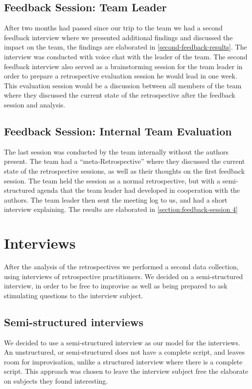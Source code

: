 \subsection{Feedback Session: Team Leader}
After two months had passed since our trip to the team we had a second feedback interview where we presented additional findings and discussed the impact on the team, the findings are elaborated in  \autoref{second-feedback-results}. The interview was conducted with voice chat with the leader of the team. The second feedback interview also served as a brainstorming session for the team leader in order to prepare a retrospective evaluation session he would lead in one week. This evaluation session would be a discussion between all members of the team where they discussed the current state of the retrospective after the feedback session and analysis.

\subsection{Feedback Session: Internal Team Evaluation}
The last session was conducted by the team internally without the authors present. The team had a ``meta-Retrospective'' where they discussed the current state of the retrospective sessions, as well as their thoughts on the first feedback session. The team held the session as a normal retrospective, but with a semi-structured agenda that the team leader had developed in cooperation with the authors. The team leader then sent the meeting log to us, and had a short interview explaining. The results are elaborated in \autoref{section:feedback-session 4}


\section{Interviews}	
After the analysis of the retrospectives we performed a second data collection, using interviews of retrospective practitioners. We decided on a semi-structured interview, in order to be free to improvise as well as being prepared to ask stimulating questions to the interview subject.

\subsection{Semi-structured interviews}
We decided to use a semi-structured interview as our model for the interviews. An unstructured, or semi-structured does not have a complete script, and leaves room for improvisation, unlike a structured interview where there is a complete script. \cite{Myers2007} This approach was chosen to leave the interview subject free the elaborate on subjects they found interesting. 

